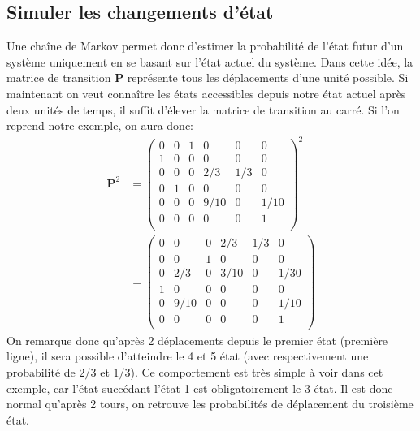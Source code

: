 \documentclass[letterpaper]{article}
\begin{document}
  \subsection{Simuler les changements d'état}
    Une chaîne de Markov permet donc d'estimer la probabilité de l'état
    futur d'un système uniquement en se basant sur l'état actuel du système.
    Dans cette idée, la matrice de transition $\mathbf{P}$ représente tous les
    déplacements d'une unité possible.  Si maintenant on veut connaître
    les états accessibles depuis notre état actuel après deux unités de temps,
    il suffit d'élever la matrice de transition au carré.  Si l'on reprend
    notre exemple, on aura donc:
    \begin{align*}
    \mathbf{P}^2 &=
      \begin{pmatrix}
	0 & 0 & 1 & 0    & 0   & 0    \\
	1 & 0 & 0 & 0    & 0   & 0    \\
	0 & 0 & 0 & 2/3  & 1/3 & 0    \\
	0 & 1 & 0 & 0    & 0   & 0    \\
	0 & 0 & 0 & 9/10 & 0   & 1/10 \\
	0 & 0 & 0 & 0    & 0   & 1    \\
      \end{pmatrix}^2\\
      &=
      \begin{pmatrix}
        0 & 0    & 0 & 2/3  & 1/3 & 0    \\
	0 & 0    & 1 & 0    & 0   & 0    \\
	0 & 2/3  & 0 & 3/10 & 0   & 1/30 \\
	1 & 0    & 0 & 0    & 0   & 0    \\
	0 & 9/10 & 0 & 0    & 0   & 1/10 \\
	0 & 0    & 0 & 0    & 0   & 1    \\
      \end{pmatrix}
    \end{align*}
    On remarque donc qu'après 2 déplacements depuis le premier état (première
    ligne), il sera possible d'atteindre le 4 et 5 état (avec
    respectivement une probabilité de $2/3$ et $1/3$).  Ce comportement est
    très simple à voir dans cet exemple, car l'état succédant l'état 1 est
    obligatoirement le 3 état.  Il est donc normal qu'après 2 tours,
    on retrouve les probabilités de déplacement du troisième état.
\end{document}
